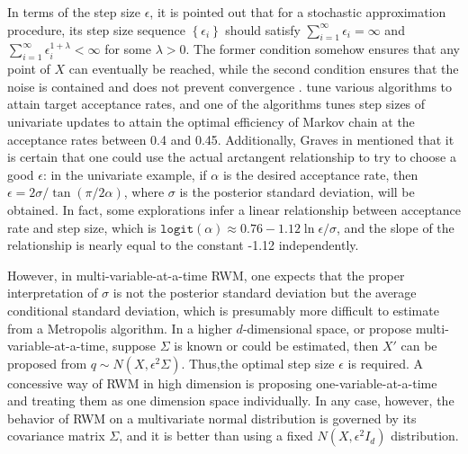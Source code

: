 In terms of the step size $\epsilon$, it is pointed out that for a stochastic approximation procedure, its step size sequence $\left\lbrace \epsilon_i\right\rbrace$ should satisfy $\sum_{i=1}^\infty \epsilon_i=\infty $ and $\sum_{i=1}^\infty \epsilon_i^{1+\lambda}<\infty $ for some $\lambda>0$. The former condition somehow ensures that any point of $X$ can eventually be reached, while the second condition ensures that the noise is contained and does not prevent convergence \cite{andrieu2008tutorial}. \cite{sherlock2010random} tune various algorithms to attain target acceptance rates, and one of the algorithms tunes step sizes of univariate updates to attain the optimal efficiency of Markov chain at the acceptance rates between 0.4 and 0.45. Additionally, Graves in \cite{graves2011automatic} mentioned that it is certain that one could use the actual arctangent relationship to try to choose a good $\epsilon$: in the univariate example, if $\alpha$ is the desired acceptance rate, then $\epsilon = 2\sigma / \tan \left(\pi/2\alpha\right)$, where $\sigma$ is the posterior standard deviation, will be obtained. In fact, some explorations infer a linear relationship between acceptance rate and step size, which is $\mathtt{logit}(\alpha) \approx 0.76-1.12\ln \epsilon/\sigma$, and the slope of the relationship is nearly equal to the constant -1.12 independently. 

However, in multi-variable-at-a-time RWM, one expects that the proper interpretation of $\sigma$ is not the posterior standard deviation but the average conditional standard deviation, which is presumably more difficult to estimate from a Metropolis algorithm. In a higher $d$-dimensional space, or propose multi-variable-at-a-time, suppose $\Sigma$ is known or could be estimated, then $X'$ can be proposed from $q\sim N\left(X,\epsilon^2\Sigma\right)$. Thus,the optimal step size $\epsilon$ is required. A concessive way of RWM in high dimension is proposing one-variable-at-a-time and treating them as one dimension space individually. In any case, however, the behavior of RWM on a multivariate normal distribution is governed by its covariance matrix $\Sigma$, and it is better than using a fixed $N\left(X,\epsilon^2I_d\right)$ distribution\cite{roberts2001optimal}.


